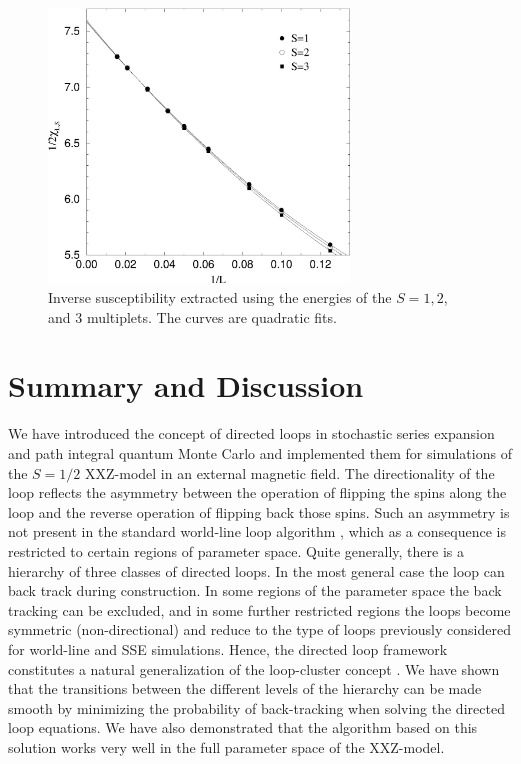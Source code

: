 \documentclass[10pt,pre,aps,twocolumn,showpacs,superscriptaddress,
floatfix]{revtex4}
\begin{document}
\begin{figure}
\includegraphics[clip,width=8cm]{fig30.eps}
\caption{Inverse susceptibility extracted using the energies of the
$S=1,2$, and $3$ multiplets. The curves are quadratic fits.}
\label{xl}
\end{figure}

\section{Summary and Discussion}

We have introduced the concept of directed loops in stochastic series 
expansion and path integral quantum Monte Carlo and implemented them for 
simulations of the $S=1/2$ XXZ-model in an external magnetic field. The 
directionality of the loop reflects the asymmetry between the operation of 
flipping the spins along the loop and the reverse operation of flipping 
back those spins. Such an asymmetry is not present in the standard world-line
loop algorithm \cite{beard,evertz,evertzchapter}, which as a consequence is 
restricted to certain regions of parameter space. 
Quite generally, there is a hierarchy of three classes of directed loops.
In the most general case the loop can back track during construction. In
some regions of the parameter space the back tracking can be excluded,
and in some further restricted regions the loops become symmetric
(non-directional) and reduce to the type of loops previously considered
for world-line \cite{beard,evertz,kawashima} and SSE \cite{sse3} simulations. 
Hence, the directed
loop framework constitutes a natural generalization of the loop-cluster
concept \cite{evertz}. We have shown that the transitions between the different
levels of the hierarchy can be made smooth by minimizing the probability
of back-tracking when solving the directed loop equations.
We have also demonstrated that the algorithm based on this solution works 
very well in the full parameter space of the XXZ-model. 
\end{document}
